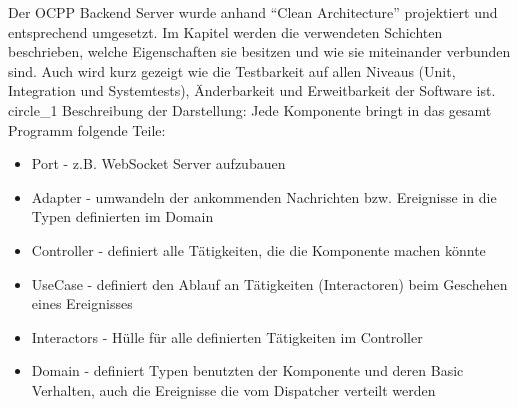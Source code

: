 Der OCPP Backend Server wurde anhand ``Clean Architecture'' projektiert und entsprechend umgesetzt. 
Im Kapitel werden die verwendeten Schichten beschrieben, welche Eigenschaften sie besitzen und wie sie miteinander verbunden sind.
Auch wird kurz gezeigt wie die Testbarkeit auf allen Niveaus (Unit, Integration und Systemtests), 
Änderbarkeit und Erweitbarkeit der Software ist.    
{circle_1}
Beschreibung der Darstellung:
Jede Komponente bringt in das gesamt Programm folgende Teile:
\begin{itemize}
    \item Port - z.B. WebSocket Server aufzubauen
    \item Adapter  - umwandeln der ankommenden Nachrichten bzw. Ereignisse in die Typen definierten im Domain
    \item Controller - definiert alle Tätigkeiten, die die Komponente machen könnte
    \item UseCase - definiert den Ablauf an Tätigkeiten (Interactoren) beim Geschehen eines Ereignisses
    \item Interactors - Hülle für alle definierten Tätigkeiten im Controller
    \item Domain - definiert Typen benutzten der Komponente und deren Basic Verhalten, auch die Ereignisse die vom Dispatcher verteilt werden
\end{itemize}
